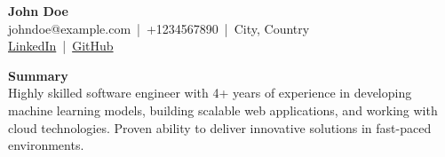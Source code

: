 \documentclass[10pt]{article}
\begin{document}
    \begin{center}
        {\Huge \textbf{John Doe}} \\
        \vspace{5pt}
        johndoe@example.com \,|\, +1234567890 \,|\, City, Country \\
        \href{https://www.linkedin.com/in/johndoe}{LinkedIn} \,|\, \href{https://github.com/johndoe}{GitHub}
    \end{center}

    \vspace{10pt}
    \noindent \textbf{Summary} \\
    Highly skilled software engineer with 4+ years of experience in developing machine learning models, building scalable web applications, and working with cloud technologies. Proven ability to deliver innovative solutions in fast-paced environments.
\end{document}
